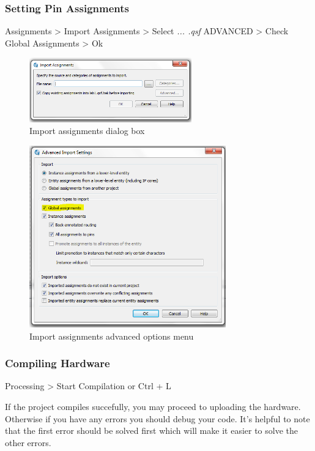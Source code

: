 \subsubsection{Setting Pin Assignments}

Assignments > Import Assignments >  Select \emph{... .qsf} %
ADVANCED > Check Global Assignments > Ok %

\begin{figure}[H]
	\centering
	\includegraphics[width=70mm]{Lab1/figures/importassign.png}
	\caption{Import assignments dialog box}
	\label{fig:importassign}
\end{figure}

\begin{figure}[H]
	\centering
	\includegraphics[width=85mm]{Lab1/figures/advancedimport.png}
	\caption{Import assignments advanced options menu}
	\label{fig:advancedimport}
\end{figure}
\subsubsection{Compiling Hardware}

Processing > Start Compilation or Ctrl + L

If the project compiles succefully, you may proceed to uploading the hardware. Otherwise if you have any errors you should debug your code. It's helpful to note that the first error should be solved first which will make it easier to solve the other errors.

